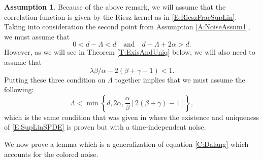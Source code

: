 \documentclass[a4paper,11pt]{article}
\numberwithin{equation}{section}
\theoremstyle{plain}
\theoremstyle{definition}
\newtheorem{assumption}[theorem]{Assumption}
\numberwithin{NQ}{section}
\numberwithin{LQ}{section}
\numberwithin{ZQ}{section}
\begin{document}
\begin{assumption} \label{A:RieszKernel}
  Because of the above remark, we will assume that the correlation function is given by the Riesz
  kernel as in \eqref{E:RieszFracSupLin}. Taking into consideration the second point from Assumption
  \ref{A:NoiseAssum1}, we must assume that
	\[
		0 < d- \Lambda < d \quad \text{and} \quad d-\Lambda + 2 \alpha > d.
	\]
  However, as we will see in Theorem \ref{T:ExisAndUniq} below, we will also need to assume that
	\[
	\lambda \beta / \alpha - 2(\beta + \gamma -1) < 1.
	\]
  Putting these three condition on $\Lambda$ together implies that we must assume the following:
	\begin{equation} \label{A:RieszParam}
	\Lambda < \min\left\{d, 2\alpha, \frac{\alpha}{\beta} \left[2(\beta + \gamma) -1\right] \right\},
	\end{equation}
  which is the same condition that was given in \cite[Theorem 1.6]{chen.eisenberg:22:interpolating}
  where the existence and uniqueness of \eqref{E:SupLinSPDE} is proven but with a time-independent
  noise.
\end{assumption}

We now prove a lemma which is a generalization of equation \eqref{C:Dalang} which accounts for the
colored noise.
\end{document}
